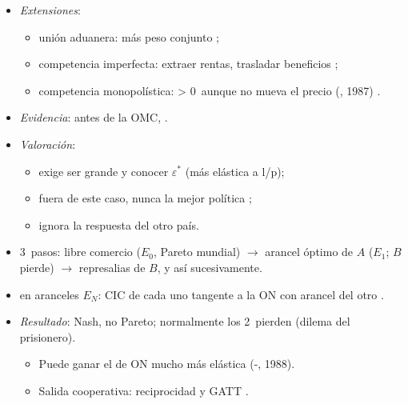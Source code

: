 \documentclass{article}
\begin{document}
\begin{columnas}
\begin{itemize}
\begin{itemize}
  \item el mundo pierde: \emph{beggar-thy-neighbour}.
  \end{itemize}
\item \emph{Extensiones}:
  \begin{itemize}
  \item unión aduanera: más peso conjunto ;
  \item competencia imperfecta: extraer rentas, trasladar beneficios ;
  \item competencia monopolística: > 0~aunque no mueva el precio (, 1987) .
  \end{itemize}
\item \emph{Evidencia}: antes de la OMC, .
\item \emph{Valoración}:
  \begin{itemize}
  \item exige ser grande y conocer $\varepsilon^*$ (más elástica a l/p);
  \item fuera de este caso, nunca la mejor política ;
  \item ignora la respuesta del otro país.
  \end{itemize}
\end{itemize}
\begin{itemize}
\item 3~pasos: libre comercio ($E_0$, Pareto mundial) $\to$ arancel óptimo de $A$ ($E_1$; $B$ pierde) $\to$ represalias de $B$, y así sucesivamente.
\item {} en aranceles $E_N$: CIC de cada uno tangente a la ON con arancel del otro .
\item \emph{Resultado}: Nash, no Pareto; normalmente los 2~pierden (dilema del prisionero).
  \begin{itemize}
  \item Puede ganar el de ON mucho más elástica (-, 1988).
  \item Salida cooperativa: reciprocidad y GATT .
  \end{itemize}
\end{itemize}

\end{columnas}
\end{document}
